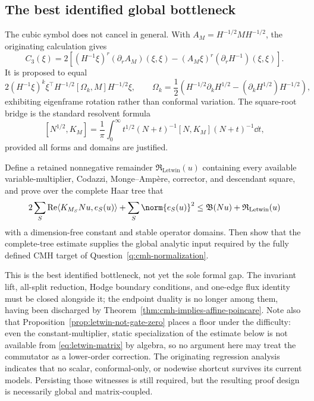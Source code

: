 \documentclass[../../main.tex]{subfiles}
\begin{document}
\subsection{The best identified global bottleneck}

The cubic symbol does not cancel in general. With $A_M=H^{-1/2}MH^{-1/2}$, the originating
calculation gives
\[
  C_3(\xi)=2\left[(H^{-1}\xi)^r(\partial_rA_M)(\xi,\xi)
  -(A_M\xi)^r(\partial_rH^{-1})(\xi,\xi)\right].
\]
It is proposed to equal
\[
  2(H^{-1}\xi)^k\xi^\top H^{-1/2}[\Omega_k,M]H^{-1/2}\xi,
  \qquad
  \Omega_k=\frac12\left(H^{-1/2}\partial_kH^{1/2}
  -(\partial_kH^{1/2})H^{-1/2}\right),
\]
exhibiting eigenframe rotation rather than conformal variation. The square-root bridge is the
standard resolvent formula
\[
  [N^{1/2},K_M]
  =\frac1\pi\int_0^\infty t^{1/2}(N+t)^{-1}
  [N,K_M](N+t)^{-1}\dd t,
\]
provided all forms and domains are justified.

\begin{question}
\label{q:mm-square-root-commutator}
Define a retained nonnegative remainder $\mathfrak R_{\mathrm{Letwin}}(u)$ containing every
available variable-multiplier, Codazzi, Monge--Amp\`ere, corrector, and descendant square, and
prove over the complete Haar tree that
\[
  2\sum_S\operatorname{Re}\langle K_{M_S}Nu,e_S(u)\rangle
  +\sum_S\norm{e_S(u)}^2
  \le \mathfrak B(Nu)+\mathfrak R_{\mathrm{Letwin}}(u)
\]
with a dimension-free constant and stable operator domains. Then show that the complete-tree
estimate supplies the global analytic input required by the fully defined CMH target of
Question~\ref{q:cmh-normalization}.
\end{question}

This is the best identified bottleneck, not yet the sole formal gap. The invariant lift, all-split
reduction, Hodge boundary conditions, and one-edge flux identity must be closed alongside it; the
endpoint duality is no longer among them, having been discharged by
Theorem~\ref{thm:cmh-implies-affine-poincare}. Note also that
Proposition~\ref{prop:letwin-not-gate-zero} places a floor under the difficulty: even the
constant-multiplier, static specialization of the estimate below is not available from
\eqref{eq:letwin-matrix} by algebra, so no argument here may treat the commutator as a
lower-order correction. The originating regression analysis indicates that no scalar, conformal-only, or
nodewise shortcut survives its current models. Persisting those witnesses is still required, but
the resulting proof design is necessarily global and matrix-coupled.
\end{document}
